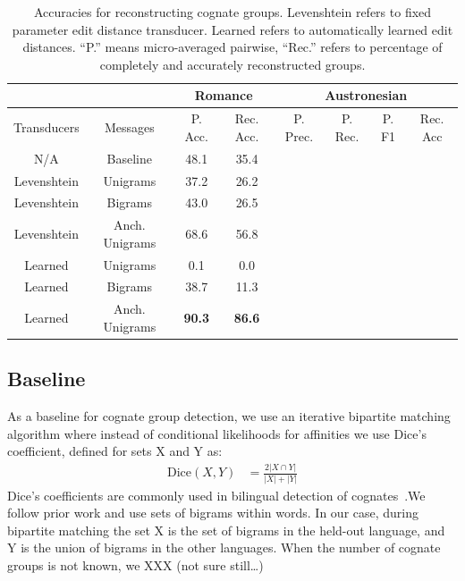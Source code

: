 \documentclass[11pt,a4paper]{article}
\begin{document}
\begin{table}
  \centering
  \small
  \begin{tabular}{|c|c|c|c||c|c|c|c||}
    \hline
    \multicolumn{2}{|c|}{\phantom{aa}} &\multicolumn{2}{|c||}{Romance} & \multicolumn{4}{|c||}{Austronesian}\\
    \hline
    Transducers & Messages & P. Acc. & Rec. Acc. & P. Prec. & P. Rec. & P. F1 & Rec. Acc\\
    \hline
    N/A & Baseline & 48.1 & 35.4  & & & &\\
    \hline
    Levenshtein&Unigrams & 37.2 & 26.2 & & & &\\
    Levenshtein&Bigrams & 43.0 & 26.5 & & & &\\
    Levenshtein&Anch. Unigrams & 68.6 & 56.8& & & &\\
    \hline 
    Learned&Unigrams & 0.1 & 0.0 & & & &\\
    Learned&Bigrams & 38.7 & 11.3 & & & &\\
    Learned&Anch. Unigrams & \textbf{90.3}  & \textbf{86.6} & & & &\\
    \hline
  \end{tabular}
  \caption{Accuracies for reconstructing cognate groups. Levenshtein
  refers to fixed parameter edit distance transducer. Learned refers
  to automatically learned edit distances. ``P.'' means micro-averaged
  pairwise, ``Rec.'' refers to percentage of completely and accurately
  reconstructed groups.}
  \label{tbl:exp1}
\end{table}

\subsection{Baseline}

As a baseline for cognate group detection, we use an iterative
bipartite matching algorithm where instead of conditional likelihoods
for affinities we use Dice's coefficient, defined for sets X and
Y as:
\begin{equation}
  \begin{split}
    \mathrm{Dice}(X,Y) &= \frac{2 |X\cap Y|}{|X| + |Y|}
   \end{split}
 \end{equation}
Dice's coefficients are commonly used in bilingual detection of
cognates~\cite{Kondrak01identifyingcognates,Kondrak03cognatescan}.We
follow prior work and use sets of bigrams within words. In our case, during
bipartite matching the set X is the set of bigrams in the held-out
language, and Y is the union of bigrams in the other languages.
When the number of cognate groups is not known, we XXX (not sure
still\dots)
\end{document}
